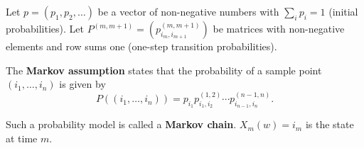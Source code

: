 Let $p = (p_1, p_2, \ldots)$ be a vector of non-negative numbers with $\sum_i p_i = 1$ (initial probabilities). Let $P^{(m,m+1)} = (p_{i_m, i_{m+1}}^{(m,m+1)})$ be matrices with non-negative elements and row sums one (one-step transition probabilities).

The \textbf{Markov assumption} states that the probability of a sample point $(i_1, \dots, i_n)$ is given by
$$P((i_1, \dots, i_n)) = p_{i_1} p_{i_1, i_2}^{(1,2)} \cdots p_{i_{n-1}, i_n}^{(n-1,n)}.$$

Such a probability model is called a \textbf{Markov chain}. $X_m(w) = i_m$ is the state at time $m$.
